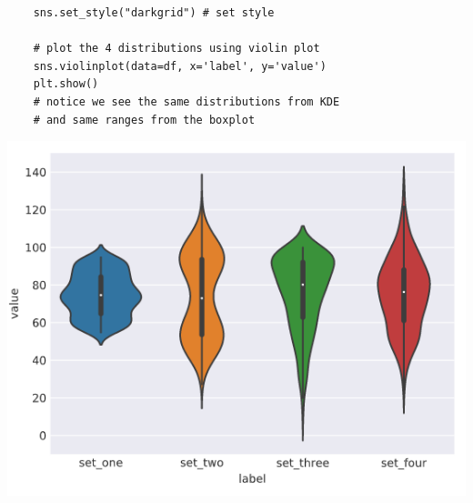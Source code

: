 \documentclass[11pt, a4paper]{article}
\begin{document}
\begin{spacing}{1.1}
\begin{minipage}[c]{10.3cm}
\begin{lstlisting}
	sns.set_style("darkgrid") # set style
	
	# plot the 4 distributions using violin plot
	sns.violinplot(data=df, x='label', y='value')
	plt.show()
	# notice we see the same distributions from KDE
	# and same ranges from the boxplot \end{lstlisting}\vspace*{1mm}
	\end{minipage}
	\begin{minipage}[c]{10cm}
		\includegraphics[scale=.48]{violin}
	\end{minipage} \\
	

\end{spacing}
\end{document}
